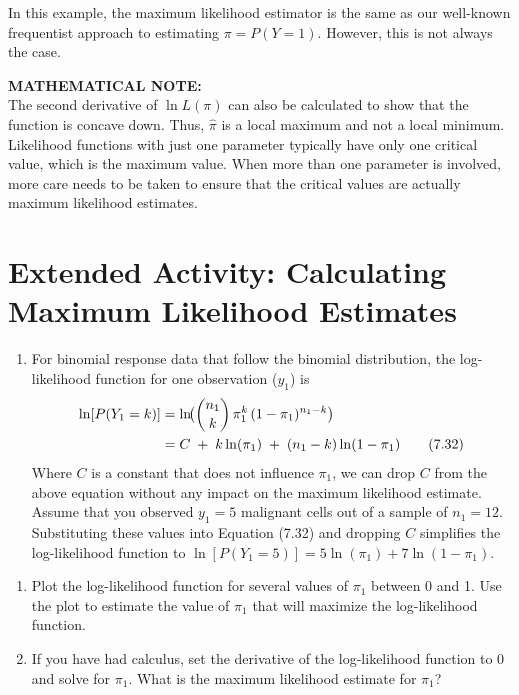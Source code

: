 \documentclass[
]{report}
\providecommand{\tightlist}{%
  \setlength{\itemsep}{0pt}\setlength{\parskip}{0pt}}
\begin{document}
In this example, the maximum likelihood estimator is the same as our well-known frequentist approach to estimating \(\pi = P(Y = 1)\). However, this is not always the case.

\large

\textbf{MATHEMATICAL NOTE:}\\
The second derivative of \(\ln L(\pi)\) can also be calculated to show that the function is concave down. Thus, \(\hat{\pi}\) is a local maximum and not a local minimum. Likelihood functions with just one parameter typically have only one critical value, which is the maximum value. When more than one parameter is involved, more care needs to be taken to ensure that the critical values are actually maximum likelihood estimates.\\
\normalsize

\section*{Extended Activity: Calculating Maximum Likelihood Estimates}\label{extended-activity-calculating-maximum-likelihood-estimates}

\begin{enumerate}
\def\labelenumi{\arabic{enumi}.}
\setcounter{enumi}{33}
\tightlist
\item
  For binomial response data that follow the binomial distribution, the log-likelihood function for one observation (\(y_1\)) is\\
  \begin{align}
  \ln[P(Y_1 = k)]
  &= \ln\!\bigl(\binom{n_1}{k}\,\pi_1^k\,(1 - \pi_1)^{n_1 - k}\bigr) \notag \\
  &= C \;+\;k\ln(\pi_1)\;+\;(n_1 - k)\ln(1 - \pi_1)
  \tag{7.32}
  \end{align}
  Where \(C\) is a constant that does not influence \(\pi_1\), we can drop \(C\) from the above equation without any impact on the maximum likelihood estimate. Assume that you observed \(y_1 = 5\) malignant cells out of a sample of \(n_1 = 12\). Substituting these values into Equation (7.32) and dropping \(C\) simplifies the log-likelihood function to \(\ln[P(Y_1 = 5)] = 5\ln(\pi_1) + 7\ln(1 - \pi_1).\)
\end{enumerate}

\begin{enumerate}
\def\labelenumi{\alph{enumi}.}
\tightlist
\item
  Plot the log-likelihood function for several values of \(\pi_1\) between 0 and 1. Use the plot to estimate the value of \(\pi_1\) that will maximize the log-likelihood function.\\
\item
  If you have had calculus, set the derivative of the log-likelihood function to 0 and solve for \(\pi_1\). What is the maximum likelihood estimate for \(\pi_1\)?
\end{enumerate}
\end{document}
